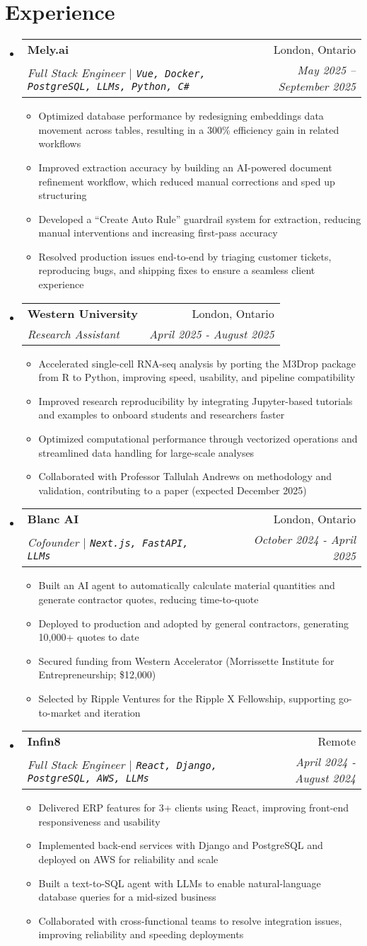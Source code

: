 \documentclass[letterpaper,10pt]{article}
\makeatletter
\newcommand{\resumeItem}[1]{
  \item\small{
    {#1 \vspace{-2pt}}
  }
}
\newcommand{\resumeSubheading}[4]{
  \vspace{-2pt}\item
    \begin{tabular*}{0.97\textwidth}[t]{l@{\extracolsep{\fill}}r}
      \textbf{#1} & #2 \\
      \textit{\small#3} & \textit{\small #4} \\
    \end{tabular*}\vspace{-7pt}
}
\newcommand{\resumeSubHeadingListStart}{\begin{itemize}[leftmargin=0.15in, label={}]}
\newcommand{\resumeSubHeadingListEnd}{\end{itemize}}
\newcommand{\resumeItemListStart}{\begin{itemize}}
\newcommand{\resumeItemListEnd}{\end{itemize}\vspace{-5pt}}
\makeatother
\begin{document}
\section{Experience}
\resumeSubHeadingListStart
  \resumeSubheading
    {Mely.ai}{London, Ontario}
    {Full Stack Engineer $|$ \textup{\texttt{Vue, Docker, PostgreSQL, LLMs, Python, C\#}}}{May 2025 -- September 2025}
    \resumeItemListStart
      \resumeItem{Optimized database performance by redesigning embeddings data movement across tables, resulting in a 300\% efficiency gain in related workflows}
      \resumeItem{Improved extraction accuracy by building an AI-powered document refinement workflow, which reduced manual corrections and sped up structuring}
      \resumeItem{Developed a ``Create Auto Rule'' guardrail system for extraction, reducing manual interventions and increasing first-pass accuracy}
      \resumeItem{Resolved production issues end-to-end by triaging customer tickets, reproducing bugs, and shipping fixes to ensure a seamless client experience}
    \resumeItemListEnd
  \resumeSubheading
    {Western University}{London, Ontario}
    {Research Assistant}{April 2025 - August 2025}
    \resumeItemListStart
      \resumeItem{Accelerated single-cell RNA-seq analysis by porting the M3Drop package from R to Python, improving speed, usability, and pipeline compatibility}
      \resumeItem{Improved research reproducibility by integrating Jupyter-based tutorials and examples to onboard students and researchers faster}
      \resumeItem{Optimized computational performance through vectorized operations and streamlined data handling for large-scale analyses}
      \resumeItem{Collaborated with Professor Tallulah Andrews on methodology and validation, contributing to a paper (expected December 2025)}
    \resumeItemListEnd
  \resumeSubheading
    {Blanc AI}{London, Ontario}
    {Cofounder $|$ \textup{\texttt{Next.js, FastAPI, LLMs}}}{October 2024 - April 2025}
    \resumeItemListStart
      \resumeItem{Built an AI agent to automatically calculate material quantities and generate contractor quotes, reducing time-to-quote}
      \resumeItem{Deployed to production and adopted by general contractors, generating 10{,}000+ quotes to date}
      \resumeItem{Secured funding from Western Accelerator (Morrissette Institute for Entrepreneurship; \$12{,}000)}
      \resumeItem{Selected by Ripple Ventures for the Ripple X Fellowship, supporting go-to-market and iteration}
    \resumeItemListEnd
  
  

  \resumeSubheading
    {Infin8}{Remote}
    {Full Stack Engineer $|$ \textup{\texttt{React, Django, PostgreSQL, AWS, LLMs}}}{April 2024 - August 2024}
    \resumeItemListStart
      \resumeItem{Delivered ERP features for 3+ clients using React, improving front-end responsiveness and usability}
      \resumeItem{Implemented back-end services with Django and PostgreSQL and deployed on AWS for reliability and scale}
      \resumeItem{Built a text-to-SQL agent with LLMs to enable natural-language database queries for a mid-sized business}
      \resumeItem{Collaborated with cross-functional teams to resolve integration issues, improving reliability and speeding deployments}
    \resumeItemListEnd
\resumeSubHeadingListEnd
\end{document}

